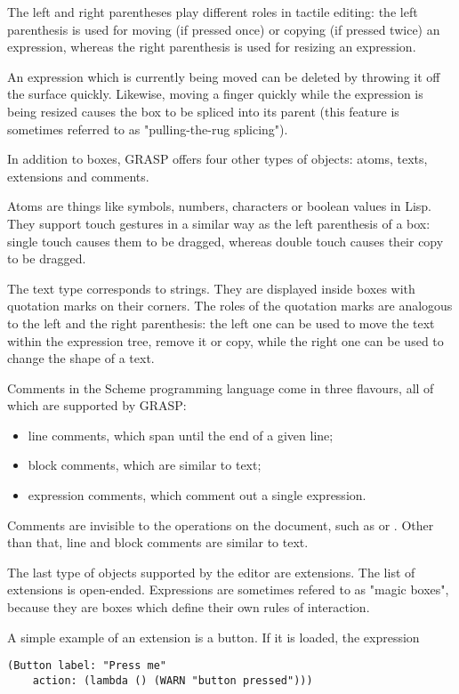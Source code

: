 \documentclass[11pt]{article}
\begin{document}
The left and right parentheses play different roles in 
tactile editing: the left parenthesis is used for moving
(if pressed once) or copying (if pressed twice) an expression,
whereas the right parenthesis is used for resizing an expression.

An expression which is currently being moved can be deleted
by throwing it off the surface quickly. Likewise, moving
a finger quickly while the expression is being resized
causes the box to be spliced into its parent (this feature
is sometimes referred to as "pulling-the-rug splicing").

In addition to boxes, GRASP offers four other types
of objects: atoms, texts, extensions and comments.

Atoms are things like symbols, numbers, characters
or boolean values in Lisp. They support touch
gestures in a similar way as the left parenthesis
of a box: single touch causes them to be dragged,
whereas double touch causes their copy to be dragged.

The text type corresponds to strings. They are 
displayed inside boxes with quotation marks
on their corners. The roles of the quotation
marks are analogous to the left and the right
parenthesis: the left one can be used to
move the text within the expression tree,
remove it or copy, while the right one can be used
to change the shape of a text.

Comments in the Scheme programming language come in
three flavours, all of which are supported by GRASP:
\begin{itemize}
\item line comments, which span until the end of a given line;
\item block comments, which are similar to text;
\item expression comments, which comment out a single expression.
\end{itemize}

Comments are invisible to the operations
on the document, such as or . 
Other than that, line and block comments are similar to text.

The last type of objects supported by the editor
are extensions. The list of extensions is open-ended.
Expressions are sometimes refered to as "magic boxes",
because they are boxes which define their own rules
of interaction.

A simple example of an extension is a button.
If it is loaded, the expression

\begin{verbatim}
(Button label: "Press me" 
	action: (lambda () (WARN "button pressed")))
\end{verbatim}
\end{document}
